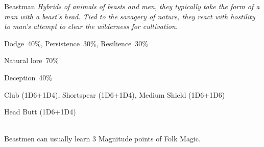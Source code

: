 \begin{monsterbox}{Beastman}
	\textit{Hybrids of animals of beasts and men, they typically take the form of a man with a beast’s head. Tied to the savagery of nature, they react with hostility to man’s attempt to clear the wilderness for cultivation.  }\\
	\rpghline
	\basics[%
        hitpoints  = 16,
	majorwound = 8,
	damagemodifier = +1D4,
	powerpoints = 11,
	movementrate = 15m,
	armor = Leather (2AP),
	plunderrating = 2
	]
	\rpghline%
	\stats[ %
		STR = 2D6+6  (13),
		CON = 1D6+12 (16),
		DEX = 3D6    (11),
		SIZ = 1D6+12 (16),
		INT = 2D6+6  (13),
		POW = 3D6    (11),
		CHA = 2D6    (7)
	]
	\rpghline%
	\begin{rpg-monsteraction}[Resistances]
		Dodge~40\%, Persistence~30\%, Resilience~30\%
	\end{rpg-monsteraction}
	\begin{rpg-monsteraction}[Knowledge]
    		Natural lore~70\%
	\end{rpg-monsteraction}
	\begin{rpg-monsteraction}[Practical]
		Deception~40\%
	\end{rpg-monsteraction}
	\begin{rpg-monsteraction}
		Club (1D6+1D4), Shortspear (1D6+1D4), Medium Shield (1D6+1D6)
	\end{rpg-monsteraction}
	\begin{rpg-monsteraction}
		Head Butt (1D6+1D4)
	\end{rpg-monsteraction}
	\begin{rpg-monsteraction}[Supernatural]\\
		Beastmen can usually learn 3 Magnitude points of Folk Magic.
	\end{rpg-monsteraction}

\end{monsterbox}





